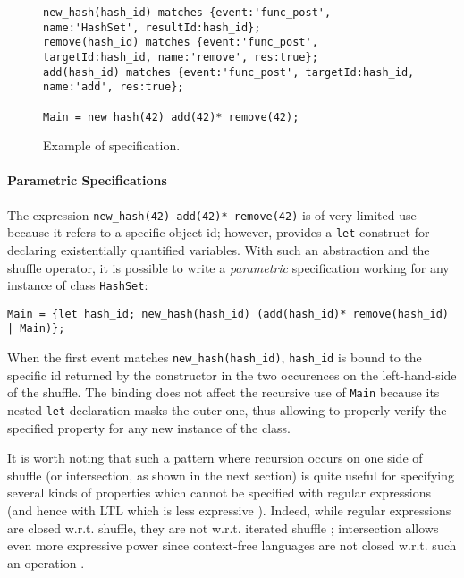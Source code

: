 \begin{figure}[h]
\begin{lstlisting}[basicstyle=\ttfamily\scriptsize]
new_hash(hash_id) matches {event:'func_post', name:'HashSet', resultId:hash_id};
remove(hash_id) matches {event:'func_post', targetId:hash_id, name:'remove', res:true};
add(hash_id) matches {event:'func_post', targetId:hash_id, name:'add', res:true};

Main = new_hash(42) add(42)* remove(42);
\end{lstlisting}
\caption{Example of specification.}\label{example}
\end{figure}

\paragraph{Parametric Specifications}
The expression \lstinline{new_hash(42) add(42)* remove(42)} is of very limited use because it refers to a specific object id;
however, \rml provides a \lstinline{let} construct \cite{AnconaFM17} for declaring existentially quantified variables.
With such an abstraction and the shuffle operator, it is possible to write a \emph{parametric} specification working for any instance of class \lstinline{HashSet}:
\begin{lstlisting}[basicstyle=\ttfamily\scriptsize]
Main = {let hash_id; new_hash(hash_id) (add(hash_id)* remove(hash_id) | Main)};
\end{lstlisting}
When the first event matches \lstinline{new_hash(hash_id)}, \lstinline{hash_id} is bound to the specific id returned by the constructor in the two
occurences on the left-hand-side of the shuffle. The binding does not affect the recursive use of \lstinline{Main}
because its nested \lstinline{let} declaration masks the outer one, thus allowing to properly verify the specified property
for any new instance of the class.

It is worth noting that such a pattern where recursion occurs on one side of shuffle (or intersection, as shown in the next section)
is quite useful for specifying several kinds of properties \cite{RML2021} which cannot be specified with regular expressions (and hence
with LTL which is less expressive \cite{Strejcek2004}). Indeed, while regular expressions are closed w.r.t. shuffle, they are not
w.r.t. iterated shuffle \cite{FlickK12}; intersection allows even more expressive power since context-free languages are not closed w.r.t. such an operation \cite{RML2021}.


